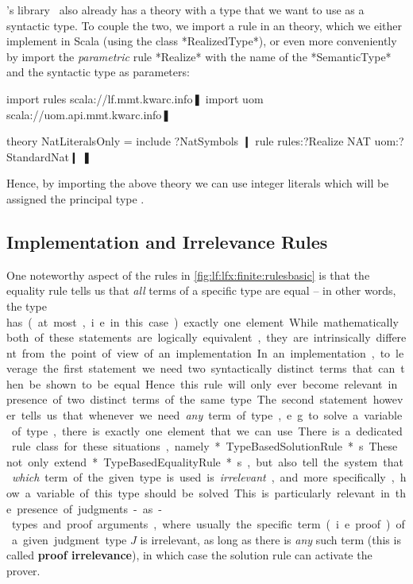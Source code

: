 \mmt's  library~\cite{MMTUR:git} also already has a theory  with a type  that we want to use as a syntactic type. To couple the two, we import a rule in an \mmt theory, which we either implement in Scala (using the class *RealizedType*), or even more conveniently by import the \emph{parametric} rule *Realize* with the name of the *SemanticType* and the syntactic type as parameters:

\begin{mmtcode}
import rules scala://lf.mmt.kwarc.info❚
import uom scala://uom.api.mmt.kwarc.info❚

theory NatLiteralsOnly =
  include ?NatSymbols ❙
  rule rules:?Realize NAT uom:?StandardNat❙
❚
\end{mmtcode}

Hence, by importing the above theory we can use integer literals which will be assigned the principal type .

\subsection{Implementation and Irrelevance Rules}\label{sec:lf:lfx:finite:impl}
One noteworthy aspect of the rules in \autoref{fig:lf:lfx:finite:rulesbasic} is that the equality rule tells us that \emph{all} terms of a specific type are equal -- in other words, the type \unit has (at most, i.e. in this case) exactly one element. While mathematically both of these statements are logically equivalent, they are intrinsically different from the point of view of an implementation.

In an implementation, to leverage the first statement we need two syntactically distinct terms that can then be shown to be equal. Hence this rule will only ever become relevant in presence of two distinct terms of the same type \unit. The second statement however tells us that whenever we need \emph{any} term of type \unit, e.g. to solve a variable of type \unit, there is exactly one element that we can use. 

There is a dedicated rule class for these situations, namely *TypeBasedSolutionRule*s. These not only extend *TypeBasedEqualityRule*s, but also tell the system that \emph{which} term of the given type is used is \emph{irrelevant}, and more specifically, how a variable of this type should be solved. This is particularly relevant in the presence of judgments-as-types and proof arguments, where usually the specific term (i.e. proof) of a given judgment type $J$ is irrelevant, as long as there is \emph{any} such term (this is called \textbf{proof irrelevance}), in which case the solution rule can activate the prover.

